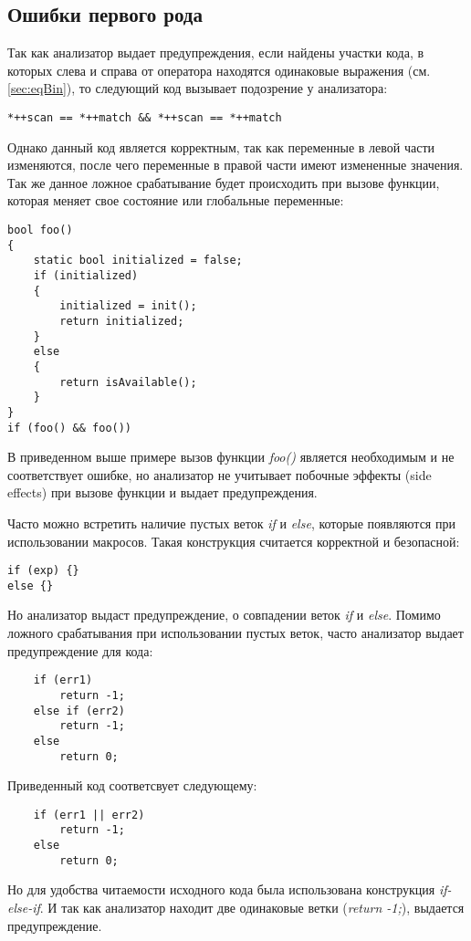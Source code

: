 \subsection*{Ошибки первого рода}
Так как анализатор выдает предупреждения, если найдены участки кода, в которых слева и справа от оператора
находятся одинаковые выражения (см. \ref{sec:eqBin}), то следующий код вызывает подозрение у анализатора: 
\begin{lstlisting}
*++scan == *++match && *++scan == *++match
\end{lstlisting}
Однако данный код является корректным, так как переменные в левой части изменяются, после чего переменные
в правой части имеют измененные значения. Так же данное ложное срабатывание будет происходить при
вызове функции, которая меняет свое состояние или глобальные переменные:
\begin{lstlisting}
bool foo()
{
	static bool initialized = false;
	if (initialized)
	{
		initialized = init(); 
		return initialized;
	}
	else
	{
		return isAvailable();
	}		
}
if (foo() && foo())
\end{lstlisting}
В приведенном выше примере вызов функции \textit{foo()} является необходимым и не соответствует ошибке, 
но анализатор не учитывает побочные эффекты (side effects) при вызове функции и выдает предупреждения.

Часто можно встретить наличие пустых веток \textit{if} и \textit{else}, которые появляются при использовании
макросов. Такая конструкция считается корректной и безопасной:
\begin{lstlisting}
if (exp) {} 
else {}
\end{lstlisting}
Но анализатор выдаст предупреждение, о совпадении веток \textit{if} и \textit{else}. Помимо 
ложного срабатывания при использовании пустых веток, часто анализатор выдает предупреждение для
кода:
\begin{lstlisting}
	if (err1)
		return -1;
	else if (err2)
		return -1;
	else
		return 0;
\end{lstlisting}
Приведенный код соответсвует следующему:
\begin{lstlisting}
	if (err1 || err2)
		return -1;
	else
		return 0;
\end{lstlisting}
Но для удобства читаемости исходного кода была использована конструкция \textit{if-else-if}. И так как
анализатор находит две одинаковые ветки (\textit{return -1;}), выдается предупреждение.

